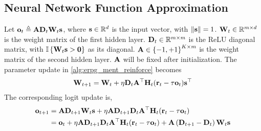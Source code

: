 \subsection{Neural Network Function Approximation}

Let ${\mathbf{o}}_t \triangleq {\mathbf{A}} {\mathbf{D}}_t {\mathbf{W}}_t {\mathbf{s}}$, where ${\mathbf{s}} \in {\mathbb{R}}^d$ is the input vector, with $\| {\mathbf{s}} \| = 1$. ${\mathbf{W}}_t \in {\mathbb{R}}^{m \times d}$ is the weight matrix of the first hidden layer. ${\mathbf{D}}_t \in {\mathbb{R}}^{m \times m}$ is the ReLU diagonal matrix, with ${\mathbb{I}}\left\{ {\mathbf{W}}_t {\mathbf{s}} > {\mathbf{0}} \right\}$ as its diagonal. ${\mathbf{A}} \in \left\{ -1, +1 \right\}^{K \times m}$ is the weight matrix of the second hidden layer. ${\mathbf{A}}$ will be fixed after initialization. The parameter update in \cref{alg:erpg_ment_reinforce} becomes
\begin{equation*}
\begin{split}
    {\mathbf{W}}_{t+1} = {\mathbf{W}}_{t} + \eta {\mathbf{D}}_t {\mathbf{A}}^\top {\mathbf{H}}_t ( {\mathbf{r}}_t - \tau {\mathbf{o}}_t) {\mathbf{s}}^\top
\end{split}
\end{equation*}
The corresponding logit update is,
\begin{equation*}
\begin{split}
    {\mathbf{o}}_{t+1} &= {\mathbf{A}} {\mathbf{D}}_{t+1} {\mathbf{W}}_{t} {\mathbf{s}} + \eta {\mathbf{A}} {\mathbf{D}}_{t+1} {\mathbf{D}}_{t} {\mathbf{A}}^\top {\mathbf{H}}_t ({\mathbf{r}}_t - \tau {\mathbf{o}}_t) \\
    &= {\mathbf{o}}_t + \eta {\mathbf{A}} {\mathbf{D}}_{t+1} {\mathbf{D}}_{t} {\mathbf{A}}^\top {\mathbf{H}}_t ({\mathbf{r}}_t - \tau {\mathbf{o}}_t) + {\mathbf{A}} \left( {\mathbf{D}}_{t+1} - {\mathbf{D}}_{t} \right) {\mathbf{W}}_{t} {\mathbf{s}}
\end{split}
\end{equation*}
